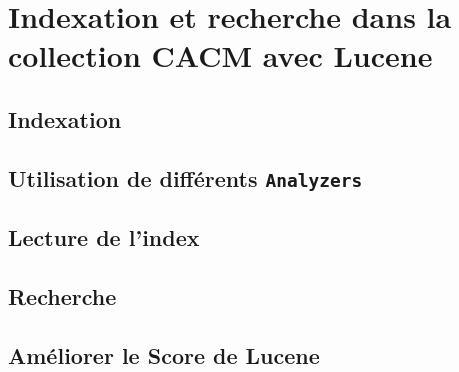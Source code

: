 \chapter{Indexation et recherche dans la collection CACM avec Lucene}

\section{Indexation}


\section{Utilisation de différents \texttt{Analyzers}}


\section{Lecture de l'index}


\section{Recherche}


\section{Améliorer le Score de Lucene}


